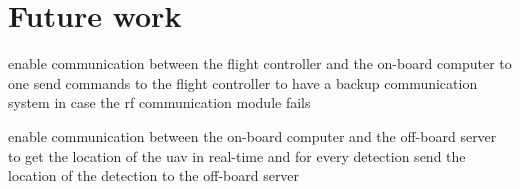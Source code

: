 \chapter{Future work}\label{ch:future_work}


enable communication between the flight controller and the on-board computer to one send commands to the flight controller to have a backup communication system in case the rf communication module fails

enable communication between the on-board computer and the off-board server to get the location of the \gls{uav} in real-time and for every detection send the location of the detection to the off-board server
